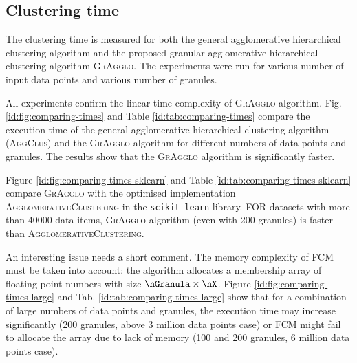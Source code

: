 \documentclass{amcs}
\newcommand{\procedura}[1]{\textsc{#1}}
\newcommand{\AgglomerativeClustering}{\procedura{Ag\-glo\-me\-ra\-ti\-ve\-Clu\-s\-te\-r\-ing}}
\newcommand{\abbrAgglomerativeClustering}{\procedura{AggClus}}
\newcommand{\MojAlg}{\procedura{GrAgglo}}
\begin{document}
\subsection{Clustering time} 

The clustering time is measured for both the general agglomerative hierarchical clustering algorithm and the proposed granular agglomerative hierarchical clustering algorithm \MojAlg{}.
The experiments were run for various number of input data points and various number of granules.

All experiments confirm the linear time complexity of \MojAlg{} algorithm. 
Fig. \ref{id:fig:comparing-times} and Table \ref{id:tab:comparing-times} 
compare the execution time of the general agglomerative hierarchical clustering algorithm (\abbrAgglomerativeClustering) and the \MojAlg{} algorithm for different numbers of data points and granules.
The results show that the \MojAlg{} algorithm is significantly faster. 

Figure \ref{id:fig:comparing-times-sklearn} 
and Table \ref{id:tab:comparing-times-sklearn}
compare \MojAlg{} with the optimised implementation \AgglomerativeClustering{} in the 
\texttt{scikit-learn} library. 
FOR datasets with more than \num{40000} data items, \MojAlg{} algorithm (even with 200 granules) is faster than \AgglomerativeClustering{}. 

An interesting issue needs a short comment. 
The memory complexity of FCM must be taken into account: the algorithm allocates a membership array of float\-ing-point numbers with size $\nGranula \times \nX$. 
Figure \ref{id:fig:comparing-times-large}
and Tab. \ref{id:tab:comparing-times-large}
show that for a combination of large numbers of data points and granules, the execution time may increase significantly (200 granules, above 3 million data points case) or FCM might fail to allocate the array due to lack of memory (100 and 200 granules, 6 million data points case).


\end{document}
